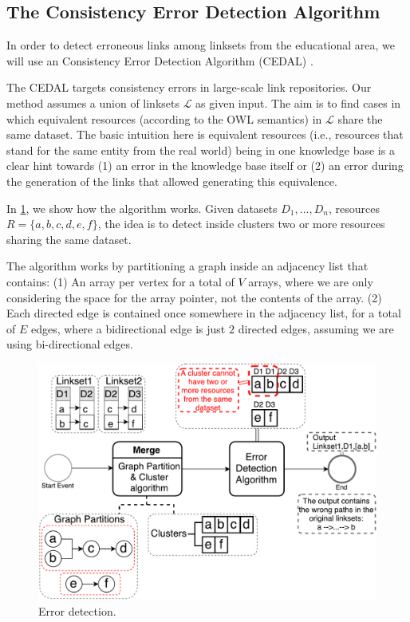 
\subsection{The Consistency Error Detection Algorithm}

In order to detect erroneous links among linksets from the educational area, we will use an Consistency Error Detection Algorithm (CEDAL) \cite{cedal2017}.

The CEDAL targets consistency errors in large-scale link repositories. Our method assumes a union of linksets $\mathcal{L}$ as given input. The aim is to find cases in which equivalent resources (according to the OWL semantics) in $\mathcal{L}$ share the same dataset. The basic intuition here is equivalent resources (i.e., resources that stand for the same entity from the real world) being in one knowledge base is a clear hint towards (1) an error in the knowledge base itself or (2) an error during the generation of the links that allowed generating this equivalence.

In \cref{fig:ErrorDetection}, we show how the algorithm works. Given datasets $D_1,...,D_n$, resources $R=\{a,b,c,d,e,f\}$, the idea is to detect inside clusters two or more resources sharing the same dataset.

The algorithm works by partitioning a graph inside an adjacency list that contains: (1) An array per vertex for a total of $V$ arrays, where we are only considering the space for the array pointer, not the contents of the array. (2) Each directed edge is contained once somewhere in the adjacency list, for a total of $E$ edges, where a bidirectional edge is just $2$ directed edges, assuming we are using bi-directional edges. %


\begin{figure}[htb] 
	\centering
	\includegraphics[width=0.86\linewidth]{img/errorDetection8.pdf}
	\caption{Error detection.}
	\label{fig:ErrorDetection}
\end{figure} 


